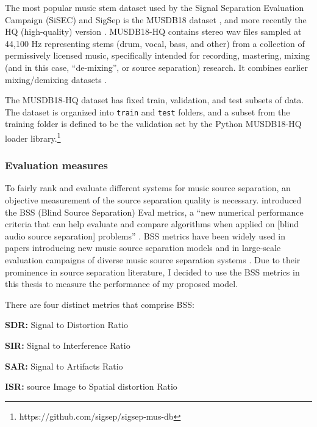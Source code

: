 \documentclass[report.tex]{subfiles}
\begin{document}
The most popular music stem dataset used by the Signal Separation Evaluation Campaign (SiSEC) and SigSep is the MUSDB18 dataset \parencite{musdb18}, and more recently the HQ (high-quality) version \parencite{musdb18hq}. MUSDB18-HQ contains stereo wav files sampled at 44,100 Hz representing stems (drum, vocal, bass, and other) from a collection of permissively licensed music, specifically intended for recording, mastering, mixing (and in this case, ``de-mixing'', or source separation) research. It combines earlier mixing/demixing datasets \parencite{sisec2016, otherdataset2}.

The MUSDB18-HQ dataset has fixed train, validation, and test subsets of data. The dataset is organized into \Verb#train# and \Verb#test# folders, and a subset from the training folder is defined to be the validation set by the Python MUSDB18-HQ loader library.\footnote{https://github.com/sigsep/sigsep-mus-db}

\subsubsection{Evaluation measures}
\label{sec:evalbss}

To fairly rank and evaluate different systems for music source separation, an objective measurement of the source separation quality is necessary. \textcite{bss, bss2} introduced the BSS (Blind Source Separation) Eval metrics, a ``new numerical performance criteria that can help evaluate and compare algorithms when applied on [blind audio source separation] problems'' \parencite[1463]{bss}. BSS metrics have been widely used in papers introducing new music source separation models \parencite{umx, xumx, dannasep, choi2021, kong2021decoupling, demucs} and in large-scale evaluation campaigns of diverse music source separation systems \parencite{sisec2016, sisec2018, mdx21}. Due to their prominence in source separation literature, I decided to use the BSS metrics in this thesis to measure the performance of my proposed model.

There are four distinct metrics that comprise BSS:

\begin{tight_itemize}
\item
	\textbf{SDR:} Signal to Distortion Ratio
\item
	\textbf{SIR:} Signal to Interference Ratio
\item
	\textbf{SAR:} Signal to Artifacts Ratio
\item
	\textbf{ISR:} source Image to Spatial distortion Ratio
\end{tight_itemize}
\end{document}

